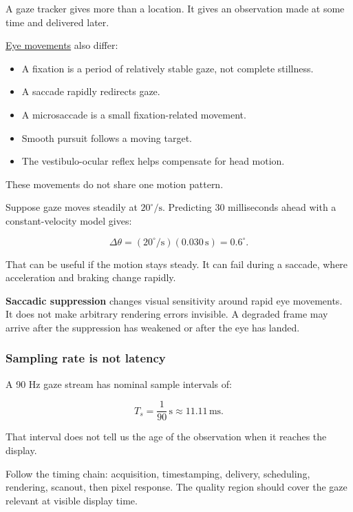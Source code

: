 A gaze tracker gives more than a location. It gives an observation made at some time and delivered later.

\hyperref[appendix-a6f2c4fe1996]{Eye movements} also differ:

\begin{itemize}
\tightlist
\item
  A fixation is a period of relatively stable gaze, not complete stillness.
\item
  A saccade rapidly redirects gaze.
\item
  A microsaccade is a small fixation-related movement.
\item
  Smooth pursuit follows a moving target.
\item
  The vestibulo-ocular reflex helps compensate for head motion.
\end{itemize}

These movements do not share one motion pattern.

Suppose gaze moves steadily at \(20^\circ/\mathrm{s}\). Predicting 30 milliseconds ahead with a constant-velocity model gives:

\[
\Delta\theta
=(20^\circ/\mathrm{s})(0.030\,\mathrm{s})
=0.6^\circ.
\]

That can be useful if the motion stays steady. It can fail during a saccade, where acceleration and braking change rapidly.

\textbf{Saccadic suppression} changes visual sensitivity around rapid eye movements. It does not make arbitrary rendering errors invisible. A degraded frame may arrive after the suppression has weakened or after the eye has landed.

\subsubsection{Sampling rate is not latency}\label{04-visual-computing-ii-ch042-sampling-rate-is-not-latency}

\hypertarget{04-visual-computing-ii-ch042-sampling-rate-is-not-latency}{}

A 90 Hz gaze stream has nominal sample intervals of:

\[
T_s=\frac1{90}\,\mathrm{s}\approx11.11\,\mathrm{ms}.
\]

That interval does not tell us the age of the observation when it reaches the display.

Follow the timing chain: acquisition, timestamping, delivery, scheduling, rendering, scanout, then pixel response. The quality region should cover the gaze relevant at visible display time.

